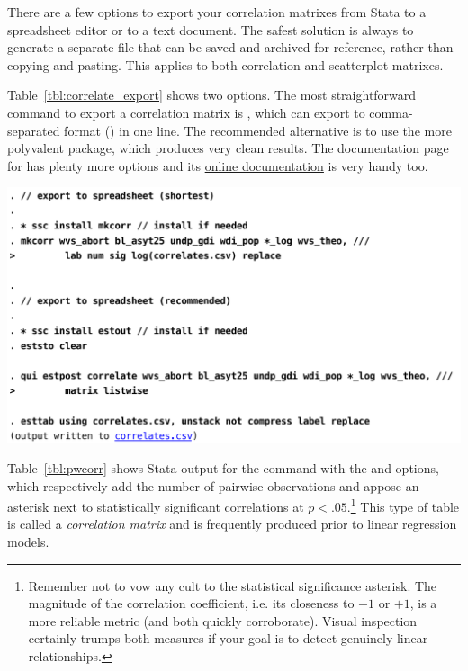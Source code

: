 There are a few options to export your correlation matrixes from Stata to a spreadsheet editor or to a text document. The safest solution is always to generate a separate file that can be saved and archived for reference, rather than copying and pasting. This applies to both correlation and scatterplot matrixes.

Table~\ref{tbl:correlate_export} shows two options. The most straightforward command to export a correlation matrix is , which can export to comma-separated format () in one line. The recommended alternative is to use the more polyvalent  package, which produces very clean results. The documentation page for  has plenty more options and its \href{http://repec.org/bocode/e/estout/estpost.html#estpost112}{online documentation} is very handy too.

\begin{table}[htp]
	\includegraphics[scale=.5]{images/correlate_export.pdf}

	\caption[Exporting a correlation matrix with  and ]{\label{tbl:correlate_export}%
	Exporting a correlation matrix with  and . %
  See  and related online documentation for options. %
	\qog}
\end{table}%

Table~\ref{tbl:pwcorr} shows Stata output for the  command with the  and  options, which respectively add the number of pairwise observations and appose an asterisk next to statistically significant correlations at $p < .05$.\footnote{Remember not to vow any cult to the statistical significance asterisk. The magnitude of the correlation coefficient, i.e. its closeness to $-1$ or $+1$, is a more reliable metric (and both quickly corroborate). Visual inspection certainly trumps both measures if your goal is to detect genuinely linear relationships.} This type of table is called a \emph{correlation matrix} and is frequently produced prior to linear regression models.


